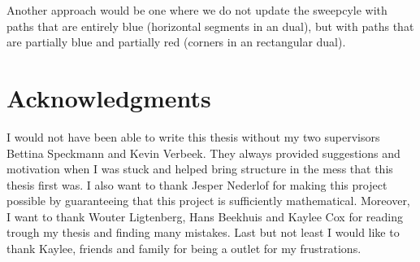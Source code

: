 Another approach would be one where we do not update the sweepcyle with paths that are entirely blue (horizontal segments in an dual), but with paths that are partially blue and partially red (corners in an rectangular dual).


\newpage
\thispagestyle{plain}
\section*{Acknowledgments}
I would not have been able to write this thesis without my two supervisors Bettina Speckmann and Kevin Verbeek. They always provided suggestions and motivation when I was stuck and helped bring structure in the mess that this thesis first was. I also want to thank Jesper Nederlof for making this project possible by guaranteeing that this project is sufficiently mathematical.
Moreover, I want to thank Wouter Ligtenberg, Hans Beekhuis and Kaylee Cox for reading trough my thesis and finding many mistakes. Last but not least I would like to thank Kaylee, friends and family for being a outlet for my frustrations.
